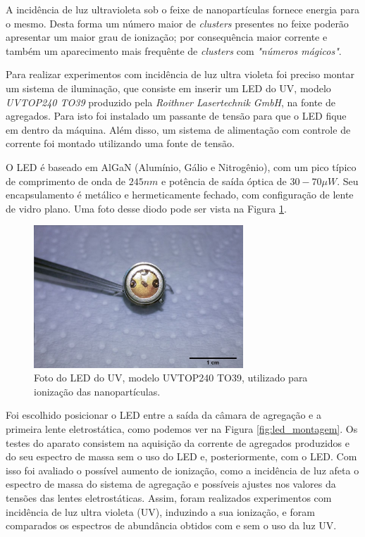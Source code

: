 A incidência de luz ultravioleta sob o feixe de nanopartículas fornece energia para o mesmo. Desta forma um número maior de \textit{clusters} presentes no feixe poderão apresentar um maior grau de ionização; por consequência maior corrente e também um aparecimento mais frequênte de \textit{clusters} com \textit{"números mágicos"}.

Para realizar experimentos com incidência de luz ultra violeta foi preciso montar um sistema de iluminação, que consiste em inserir um LED do UV, modelo \textit{UVTOP240 TO39} produzido pela \textit{Roithner Lasertechnik GmbH}, na fonte de agregados. Para isto foi instalado um passante de tensão para que o LED fique em dentro da máquina. Além disso, um sistema de alimentação com controle de corrente foi montado utilizando uma fonte de tensão.

O LED é baseado em AlGaN (Alumínio, Gálio e Nitrogênio), com um pico típico de comprimento de onda de $245 nm$ e potência de saída óptica de $30-70 \mu W$. Seu encapsulamento é metálico e hermeticamente fechado, com configuração de lente de vidro plano. Uma foto desse diodo pode ser vista na Figura \ref{fig:foto_led}.

\begin{figure}
  \centering
  \includegraphics[width=0.7\textwidth]{images/foca/led_scale}
  \caption{ Foto do LED do UV, modelo UVTOP240 TO39, utilizado para ionização das nanopartículas.  }
  \label{fig:foto_led}
\end{figure}


Foi escolhido posicionar o LED entre a saída da câmara de agregação e a primeira lente eletrostática, como podemos ver na Figura \ref{fig:led_montagem}. Os testes do aparato consistem na aquisição da corrente de agregados produzidos e do seu espectro de massa sem o uso do LED e, posteriormente, com o LED. Com isso foi avaliado o possível aumento de ionização, como a incidência de luz afeta o espectro de massa do sistema de agregação e possíveis ajustes nos valores da tensões das lentes eletrostáticas.
Assim, foram realizados experimentos com incidência de luz ultra violeta (UV), induzindo a sua ionização, e foram comparados os espectros de abundância obtidos com e sem o uso da luz UV. 



